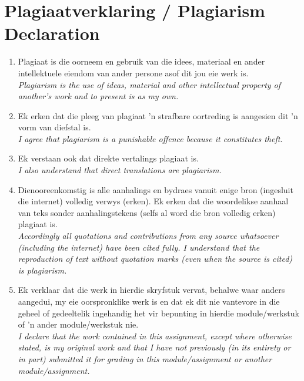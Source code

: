 \chapter*{Plagiaatverklaring / Plagiarism Declaration}
\makeatletter{}\makeatother

{\small
\begin{enumerate}\setlength{\itemsep}{0.4ex}
	\item Plagiaat is die oorneem en gebruik van die idees, materiaal en ander
	intellektuele eiendom van ander persone asof dit jou eie werk is.\\
	\textit{Plagiarism is the use of ideas, material and other intellectual
	property of another's work and to present is as my own.}

	\item Ek erken dat die pleeg van plagiaat 'n strafbare oortreding is aangesien
	dit 'n vorm van diefstal is.\\
	\textit{I agree that plagiarism is a punishable offence because it
	constitutes theft.}

	\item Ek verstaan ook dat direkte vertalings plagiaat is.\\
	\textit{I also understand that direct translations are plagiarism.}

	\item Dienooreenkomstig is alle aanhalings en bydraes vanuit enige bron
	(ingesluit die internet) volledig verwys (erken). Ek erken dat die woordelikse
	aanhaal van teks sonder aanhalingstekens (selfs al word die bron volledig
	erken) plagiaat is.\\
	\textit{Accordingly all quotations and contributions from any source
	whatsoever (including the internet) have been cited fully. I understand
	that the reproduction of text without quotation marks (even when the source
	is cited) is plagiarism.}

	\item Ek verklaar dat die werk in hierdie skryfstuk vervat, behalwe waar anders
	aangedui, my eie oorspronklike werk is en dat ek dit nie vantevore in die
	geheel of gedeeltelik ingehandig het vir bepunting in hierdie
	module/werkstuk of 'n ander module/werkstuk nie.\\
	\textit{I declare that the work contained in this assignment, except where
	otherwise stated, is my original work and that I have not previously (in
	its entirety or in part) submitted it for grading in this module/assignment
	or another module/assignment.}
\end{enumerate}
}

